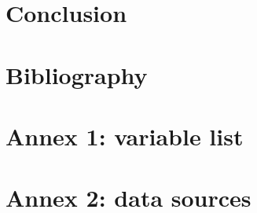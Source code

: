 \documentclass[a4paper]{article}
\begin{document}
\section{Conclusion}

\section{Bibliography}

\section{Annex 1: variable list}

\section{Annex 2: data sources}
\end{document}
